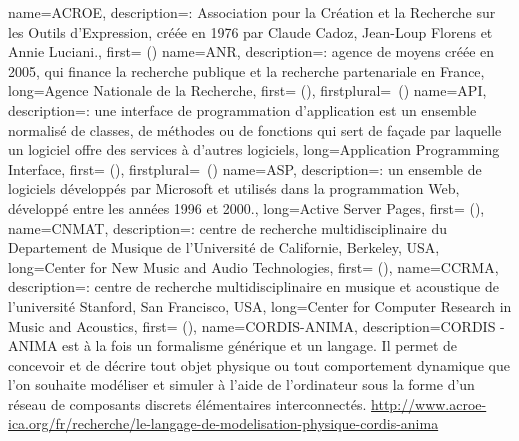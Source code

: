 {
    name={ACROE},
    description={\textit{}: Association pour la Création et la Recherche sur les Outils d'Expression, créée en 1976 par Claude Cadoz, Jean-Loup Florens et Annie Luciani.},
    first={} ()
}
{
    name={ANR},
    description={\textit{}: agence de moyens créée en 2005, qui finance la recherche publique et la recherche partenariale en France},
    long={Agence Nationale de la Recherche},
    first={} (),
    firstplural={\glspluralsuffix\ (\glspluralsuffix)}
}
{
    name={API},
    description={\textit{}: une interface de programmation d’application est un ensemble normalisé de classes, de méthodes ou de fonctions qui sert de façade par laquelle un logiciel offre des services à d'autres logiciels},
    long={Application Programming Interface},
    first={} (),
    firstplural={\glspluralsuffix\ (\glspluralsuffix)}
}
{
    name={ASP},
    description={\textit{}: un ensemble de logiciels développés par Microsoft et utilisés dans la programmation Web, développé entre les années 1996 et 2000.},
    long={Active Server Pages},
    first={} (),
}
{
    name={CNMAT},
    description={\textit{}: centre de recherche multidisciplinaire du Departement de Musique de l'Université de Californie, Berkeley, USA},
    long={Center for New Music and Audio Technologies},
    first={} (),
}
{
    name={CCRMA},
    description={\textit{}: centre de recherche multidisciplinaire en musique et acoustique de l'université Stanford, San Francisco, USA},
    long={Center for Computer Research in Music and Acoustics},
    first={} (),
}
{
    name={CORDIS-ANIMA},
    description={CORDIS - ANIMA est à la fois un formalisme générique et un langage. Il permet de concevoir et de décrire tout objet physique ou tout comportement dynamique que l'on souhaite modéliser et simuler à l'aide de l'ordinateur sous la forme d'un réseau de composants discrets élémentaires interconnectés. \url{http://www.acroe-ica.org/fr/recherche/le-langage-de-modelisation-physique-cordis-anima}}
}

